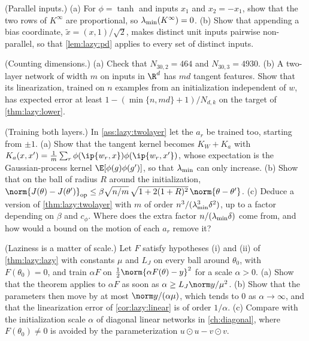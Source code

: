\begin{refsection}
\begin{exercises}
\item \consolidation (Parallel inputs.) (a) For $\phi=\tanh$ and inputs $x_1$ and $x_2=-x_1$, show that the two rows of $K^\infty$ are proportional, so $\lambda_{\min}(K^\infty)=0$. (b) Show that appending a bias coordinate, $\tilde x=(x,1)/\sqrt2$, makes distinct unit inputs pairwise non-parallel, so that \cref{lem:lazy:pd} applies to every set of distinct inputs.\label{ex:lazy:pd}

\item \consolidation (Counting dimensions.) (a) Check that $N_{30,2}=464$ and $N_{30,3}=4930$. (b) A two-layer network of width $m$ on inputs in $\R^d$ has $md$ tangent features. Show that its linearization, trained on $n$ examples from an initialization independent of $w$, has expected error at least $1-(\min\{n,md\}+1)/N_{d,k}$ on the target of \cref{thm:lazy:lower}.\label{ex:lazy:count}

\item \variation\hard (Training both layers.) In \cref{ass:lazy:twolayer} let the $a_r$ be trained too, starting from $\pm1$. (a) Show that the tangent kernel becomes $K_W+K_a$ with $K_a(x,x')=\frac1m\sum_r\phi(\ip{w_r,x})\phi(\ip{w_r,x'})$, whose expectation is the Gaussian-process kernel $\E[\phi(g)\phi(g')]$, so that $\lambda_{\min}$ can only increase. (b) Show that on the ball of radius $R$ around the initialization, $\norm{J(\theta)-J(\theta')}_{\op}\le\beta\sqrt{n/m}\,\sqrt{1+2(1+R)^2}\,\norm{\theta-\theta'}$. (c) Deduce a version of \cref{thm:lazy:twolayer} with $m$ of order $n^3/(\lambda_{\min}^3\delta^2)$, up to a factor depending on $\beta$ and $c_\phi$. Where does the extra factor $n/(\lambda_{\min}\delta)$ come from, and how would a bound on the motion of each $a_r$ remove it? \label{ex:lazy:bothlayers}

\item \variation (Laziness is a matter of scale.) Let $F$ satisfy hypotheses (i) and (ii) of \cref{thm:lazy:lazy} with constants $\mu$ and $L_J$ on every ball around $\theta_0$, with $F(\theta_0)=0$, and train $\alpha F$ on $\frac12\norm{\alpha F(\theta)-y}^2$ for a scale $\alpha>0$. (a) Show that the theorem applies to $\alpha F$ as soon as $\alpha\ge L_J\norm y/\mu^2$. (b) Show that the parameters then move by at most $\norm y/(\alpha\mu)$, which tends to $0$ as $\alpha\to\infty$, and that the linearization error of \cref{cor:lazy:linear} is of order $1/\alpha$. (c) Compare with the initialization scale $\alpha$ of diagonal linear networks in \cref{ch:diagonal}, where $F(\theta_0)\ne0$ is avoided by the parameterization $u\odot u-v\odot v$.\label{ex:lazy:scale}


\end{exercises}
\end{refsection}
